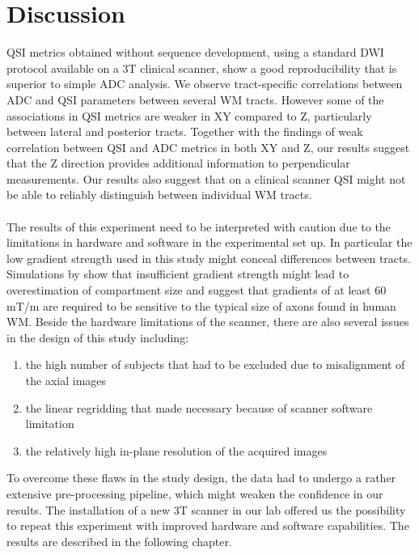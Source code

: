 \section{Discussion} \gls{QSI} metrics obtained without sequence development, using a standard {\gls{DWI}} protocol available on a 3T clinical scanner, show a good reproducibility that is superior to simple \gls{ADC} analysis. We observe tract-specific correlations between \gls{ADC} and \gls{QSI} parameters between several WM tracts. However some of the associations in \gls{QSI} metrics are weaker in XY compared to Z, particularly between lateral and posterior tracts. Together with the findings of weak correlation between \gls{QSI} and ADC metrics in both XY and Z, our results suggest that the Z direction provides additional information to perpendicular measurements. Our results also suggest that on a clinical scanner \gls{QSI} might not be able to reliably distinguish between individual \gls{WM} tracts.

\paragraph{} The results of this experiment need to be interpreted with caution due to the limitations in hardware and software in the experimental set up. In particular the low gradient strength used in this study might conceal differences between tracts. Simulations by \citet{Latt:2007} show that insufficient gradient strength might lead to overestimation of compartment size and suggest that gradients of at least 60 mT/m are required to be sensitive to the typical size of axons found in human WM. Beside the hardware limitations of the scanner, there are also several issues in the design of this study including:
\begin{enumerate}
	\item the high number of subjects that had to be excluded due to misalignment of the axial images
	\item the linear regridding that made necessary because of scanner software limitation
	\item the relatively high in-plane resolution of the acquired images
\end{enumerate}
To overcome these flaws in the study design, the data had to undergo a rather extensive pre-processing pipeline, which might weaken the confidence in our results. The installation of a new 3T scanner in our lab offered us the possibility to repeat this experiment with improved hardware and software capabilities. The results are described in the following chapter.
